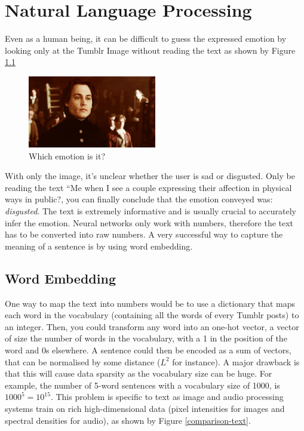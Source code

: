 \chapter{Natural Language Processing}
Even as a human being, it can be difficult to guess the expressed emotion by looking only at the Tumblr Image without reading the text as shown by Figure \ref{disgusted-unclear}

\begin{figure}[H]
    \centering
    \includegraphics[width=0.5\textwidth]{Images/disgusted.jpg}
    \caption{Which emotion is it?}
    \label{disgusted-unclear}
\end{figure}

With only the image, it's unclear whether the user is sad or disgusted. Only be reading the text ``Me when I see a couple expressing their affection in physical ways in public?, you can finally conclude that the emotion conveyed was: {\em disgusted}. The text is extremely informative and is usually crucial to accurately infer the emotion. Neural networks only work with numbers, therefore the text has to be converted into raw numbers. A very successful way to capture the meaning of a sentence is by using word embedding.
\newpage
\section{Word Embedding}
One way to map the text into numbers would be to use a dictionary that maps each word in the vocabulary (containing all the words of every Tumblr posts) to an integer. Then, you could transform any word into an one-hot vector, a vector of size the number of words in the vocabulary, with a 1 in the position of the word and 0s elsewhere. A sentence could then be encoded as a sum of vectors, that can be normalised by some distance ($L^2$ for instance). A major drawback is that this will cause data sparsity as the vocabulary size can be huge. For example, the number of 5-word sentences with a vocabulary size of 1000, is $1000^5=10^{15}$. This problem is specific to text as image and audio processing systems train on rich high-dimensional data (pixel intensities for images and spectral densities for audio), as shown by Figure \ref{comparison-text}.

